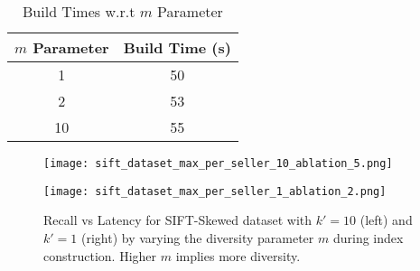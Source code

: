 \begin{table} 
\centering
\begin{tabular}{|c|c|}
\hline
$m$ Parameter  & Build Time (s) \\
\hline
1 &  50 \\
2 &  53 \\
10 &  55 \\
\hline
\end{tabular}
\caption{Build Times w.r.t $m$ Parameter}
\label{tbl:build}
\end{table}

\begin{figure}[!ht]
    \centering
    \begin{minipage}{0.33\textwidth}
        \centering
\texttt{[image: sift\_dataset\_max\_per\_seller\_10\_ablation\_5.png]}
    \end{minipage}\hspace{1cm}
    \begin{minipage}{0.33\textwidth}
        \centering
\texttt{[image: sift\_dataset\_max\_per\_seller\_1\_ablation\_2.png]}
    \end{minipage}
    \caption{Recall vs Latency for SIFT-Skewed dataset with $k'=10$ (left) and $k'=1$ (right) by varying the diversity parameter $m$ during index construction. Higher $m$ implies more diversity.}
    \label{fig:recall-latency-ablation}
\end{figure}

